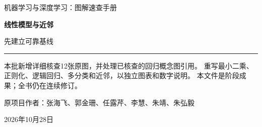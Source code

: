 \documentclass[a4paper,11pt,oneside,openany]{book}
\begin{document}
\frontmatter
\hypersetup{pageanchor=false}
\begin{titlepage}
\vspace*{16mm}
{\sffamily\color{Teal}\large 机器学习与深度学习：图解速查手册\par}
\vspace{15mm}
{\sffamily\bfseries\color{Ink}\Huge 线性模型与近邻\par}
\vspace{6mm}
{\sffamily\color{Ink}\LARGE 先建立可靠基线\par}
\vspace{12mm}
\noindent\textcolor{Teal}{\rule{\textwidth}{1.2pt}}
\vspace{7mm}
\begin{keyidea}[第七批阶段样章]
本批新增详细核查12张原图，并处理已核查的回归概念图引用。
重写最小二乘、正则化、逻辑回归、多分类和近邻，以独立图表和数字说明。
本文件是阶段成果；全书仍在连续修订。
\end{keyidea}
\vfill
原项目作者：张海飞、郭金珊、任露芹、李慧、朱靖、朱弘毅\par
\vspace{4mm}
2026年10月28日\par
\end{titlepage}
\hypersetup{pageanchor=true}
\tableofcontents
\mainmatter
\setcounter{chapter}{6}

\end{document}
